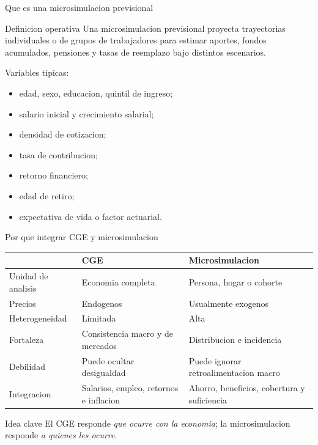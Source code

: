\documentclass[10pt,aspectratio=169]{beamer}
\begin{document}
\begin{frame}{Que es una microsimulacion previsional}
\begin{block}{Definicion operativa}
Una microsimulacion previsional proyecta trayectorias individuales o de grupos de trabajadores para estimar aportes, fondos acumulados, pensiones y tasas de reemplazo bajo distintos escenarios.
\end{block}

\vspace{0.2cm}
Variables tipicas:
\begin{itemize}
  \item edad, sexo, educacion, quintil de ingreso;
  \item salario inicial y crecimiento salarial;
  \item densidad de cotizacion;
  \item tasa de contribucion;
  \item retorno financiero;
  \item edad de retiro;
  \item expectativa de vida o factor actuarial.
\end{itemize}
\end{frame}

\begin{frame}{Por que integrar CGE y microsimulacion}
\small
\begin{tabular}{p{3.5cm} p{4.4cm} p{4.4cm}}
\toprule
 & \textbf{CGE} & \textbf{Microsimulacion} \\
\midrule
Unidad de analisis & Economia completa & Persona, hogar o cohorte \\
Precios & Endogenos & Usualmente exogenos \\
Heterogeneidad & Limitada & Alta \\
Fortaleza & Consistencia macro y de mercados & Distribucion e incidencia \\
Debilidad & Puede ocultar desigualdad & Puede ignorar retroalimentacion macro \\
Integracion & Salarios, empleo, retornos e inflacion & Ahorro, beneficios, cobertura y suficiencia \\
\bottomrule
\end{tabular}

\vspace{0.3cm}
\begin{alertblock}{Idea clave}
El CGE responde \textit{que ocurre con la economia}; la microsimulacion responde \textit{a quienes les ocurre}.
\end{alertblock}
\end{frame}
\end{document}
